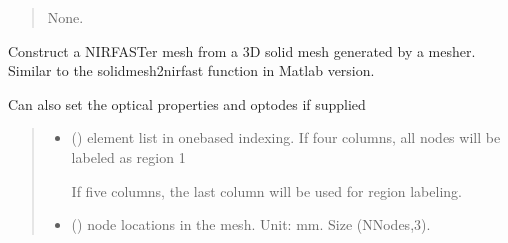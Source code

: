 \documentclass[letterpaper,10pt,english]{sphinxmanual}
\begin{document}
\begin{fulllineitems}
\begin{fulllineitems}
\begin{quote}
\begin{description}
\begin{itemize}
\end{itemize}

\sphinxAtStartPar
None.

\end{description}\end{quote}

\end{fulllineitems}


\begin{fulllineitems}
\label{\detokenize{_autosummary/nirfasterff.base.stnd_mesh.stndmesh:nirfasterff.base.stnd_mesh.stndmesh.from_solid}}
\pysigstartsignatures
{}
\pysigstopsignatures
\sphinxAtStartPar
Construct a NIRFASTer mesh from a 3D solid mesh generated by a mesher. Similar to the solidmesh2nirfast function in Matlab version.

\sphinxAtStartPar
Can also set the optical properties and optodes if supplied
\begin{quote}\begin{description}
\begin{itemize}
\item {} 
\sphinxAtStartPar
{} () \textendash{} 
\sphinxAtStartPar
element list in one\sphinxhyphen{}based indexing. If four columns, all nodes will be labeled as region 1

\sphinxAtStartPar
If five columns, the last column will be used for region labeling.


\item {} 
\sphinxAtStartPar
{} () \textendash{} node locations in the mesh. Unit: mm. Size (NNodes,3).


\end{itemize}
\end{description}
\end{quote}
\end{fulllineitems}
\end{fulllineitems}
\end{document}

